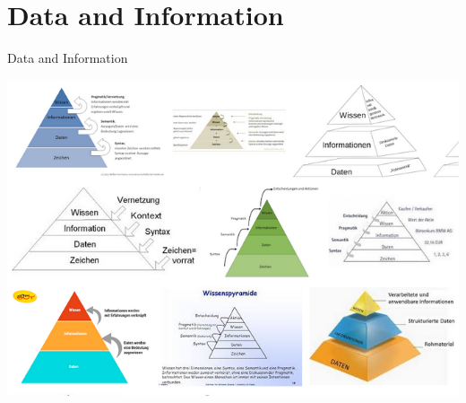 \documentclass{beamer}
\begin{document}
\section{Data and Information}
\begin{frame}{Data and Information}

  \begin{center}
    \includegraphics[width=\textwidth]{NuqlkG.png}
  \end{center}
\end{frame}
\end{document}
